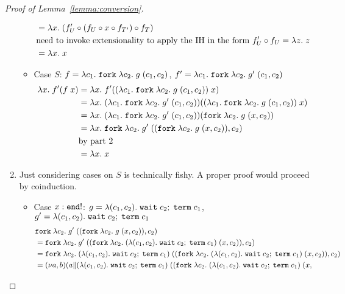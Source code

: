 \begin{proof}[Proof of Lemma~\ref{lemma:conversion}]
\begin{enumerate}
\begin{itemize}
\begin{align*}
        &= \lambda x.\; (f'_U \circ (f_U \circ x \circ f_{T'})
          \circ f_T) \\
        & \text{need to invoke extensionality to apply the IH in the
          form } f'_U \circ f_U = \lambda z.\; z  \\
        &= \lambda x.\; x
      \end{align*}
    \item Case $S$: $f = \lambda c_1.\; \mathtt{fork}\;  \lambda c_2.\; g \; (c_1,
        c_2)$, 
      $f' = \lambda c_1.\; \mathtt{fork}\;  \lambda c_2.\; g' \; (c_1, c_2)$
      \begin{align*}
        \lambda x.\; f' (f\; x)
        &= \lambda x.\; f' ((\lambda c_1.\; \mathtt{fork}\;  \lambda c_2.\; g \; (c_1,
          c_2))\; x) \\
        &= \lambda x.\;
          (\lambda c_1.\; \mathtt{fork}\;  \lambda c_2.\; g' \; (c_1, c_2))
          ((\lambda c_1.\; \mathtt{fork}\;  \lambda c_2.\; g \; (c_1, c_2))\; x) \\
        &= \lambda x.\;
          (\lambda c_1.\; \mathtt{fork}\;  \lambda c_2.\; g' \; (c_1, c_2))
          (\mathtt{fork}\;  \lambda c_2.\; g \; (x, c_2)) \\
        &= \lambda x.\;
          \mathtt{fork}\;  \lambda c_2.\; g' \; ((\mathtt{fork}\;  \lambda c_2.\; g \; (x,
          c_2)), c_2) \\
        & \text{by part~2} \\
        & = \lambda x.\; x
      \end{align*}
    \end{itemize}
  \item Just considering cases on $S$ is technically fishy. A proper
    proof would proceed by coinduction.
    \begin{itemize}
    \item Case $x : \mathtt{end !}$:
      $g = \lambda (c_1, c_2).\; \mathtt{wait}\; c_2;\; {\mathtt{term}\; c_1}$,
      $g' = \lambda (c_1, c_2).\; \mathtt{wait}\; c_2;\; {\mathtt{term}\; c_1}$
      \begin{align*}
        & 
        \EFork{ \ELam {c_2} g' \; ((\EFork{ \ELam {c_2} g \; (x,
        c_2) }), c_2)} \\
        &=
        \EFork{ \ELam {c_2} g' \; ((\EFork{ \ELam {c_2} (\ELam {(c_1, c_2)} \ELetU {\EWait {c_2}} {\ETerm {c_1}}) \; (x,
        c_2) }), c_2)} \\
        &=
        \EFork{ \ELam {c_2} (\ELam {(c_1, c_2)} \ELetU {\EWait {c_2}} {\ETerm {c_1}}) \; ((\EFork{ \ELam {c_2} (\ELam {(c_1, c_2)} \ELetU {\EWait {c_2}} {\ETerm {c_1}}) \; (x,
        c_2) }), c_2)} \\
        &=
          \PScope
          (\PPar a {(\ELam {(c_1, c_2)} \ELetU {\EWait {c_2}} {\ETerm {c_1}}) \; ((\EFork{ \ELam {c_2} (\ELam {(c_1, c_2)} \ELetU {\EWait {c_2}} {\ETerm {c_1}}) \; (x,
}}
\end{align*}
\end{itemize}
\end{enumerate}
\end{proof}
